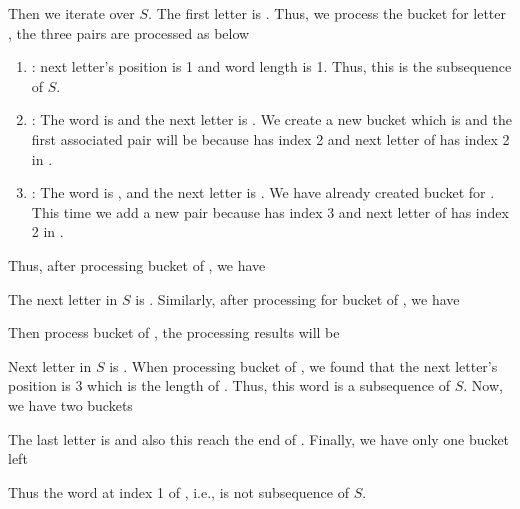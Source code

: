 Then we iterate over $S$. The first letter is . Thus, we process the bucket for letter , the three pairs are processed as below

\begin{enumerate}
\item {}: next letter's position is 1 and word  length is 1. Thus, this is the subsequence of $S$.
\item {}: The word is  and the next letter is . We create a new bucket which is  and the first associated pair will be  because  has index 2 and next letter of  has index 2 in .
\item {}: The word is , and the next letter is . We have already created bucket for . This time we add a new pair  because  has index 3 and next letter of  has index 2 in .
\end{enumerate}

Thus, after processing bucket of , we have 



The next letter in $S$ is . Similarly, after processing for bucket of , we have



Then process bucket of , the processing results will be 




Next letter in $S$ is . When processing bucket of , we found that the next letter's position is 3 which is the length of . Thus, this word is a subsequence of $S$. Now, we have two buckets



The last letter is  and also this reach the end of . Finally, we have only one bucket left


Thus the word at index 1 of , i.e.,  is not subsequence of $S$.

